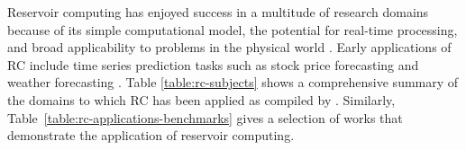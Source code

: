 
Reservoir computing has enjoyed success in a multitude of research domains because of its simple computational model, the potential for real-time processing, and broad applicability to problems in the physical world \citep{tanaka_recent_2019}. 
Early applications of RC include time series prediction tasks such as stock price forecasting and weather forecasting \citep{nakajima_physical_2020}. 
Table \ref{table:rc-subjects} shows a comprehensive summary of the domains to which RC has been applied as compiled by \citet{tanaka_recent_2019}.
Similarly, \mbox{Table \ref{table:rc-applications-benchmarks}} gives a selection of works that demonstrate the application of reservoir computing. 















 